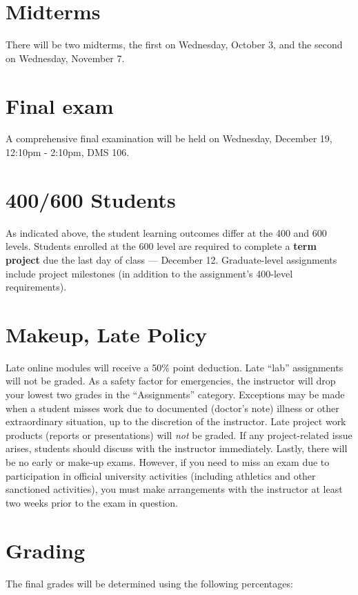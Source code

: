 \documentclass[11pt,onecolumn]{article}
\begin{document}
\section*{Midterms}
There will be two midterms, the first on Wednesday, October 3, and the second on Wednesday, November 7.

\section*{Final exam}
A comprehensive final examination will be held on Wednesday, December 19, 12:10pm - 2:10pm, DMS 106.

\section*{400/600 Students}
As indicated above, the student learning outcomes differ at the 400 and 600 levels. Students enrolled at the 600 level are required to complete a \textbf{term project} due the last day of class --- December 12. Graduate-level assignments include project milestones (in addition to the assignment's 400-level requirements).

\section*{Makeup, Late Policy}
Late online modules will receive a 50\% point deduction. Late ``lab'' assignments will not be graded. As a safety factor for emergencies, the instructor will drop your lowest two grades in the ``Assignments'' category. Exceptions may be made when a student misses work due to documented (doctor's note) illness or other extraordinary situation, up to the discretion of the instructor. Late project work products (reports or presentations) will \textit{not} be graded. If any project-related issue arises, students should discuss with the instructor immediately. Lastly, there will be no early or make-up exams. However, if you need to miss an exam due to participation in official university activities (including athletics and other sanctioned activities), you must make arrangements with the instructor at least two weeks prior to the exam in question. 

\section*{Grading}
The final grades will be determined using the following percentages:
\end{document}
